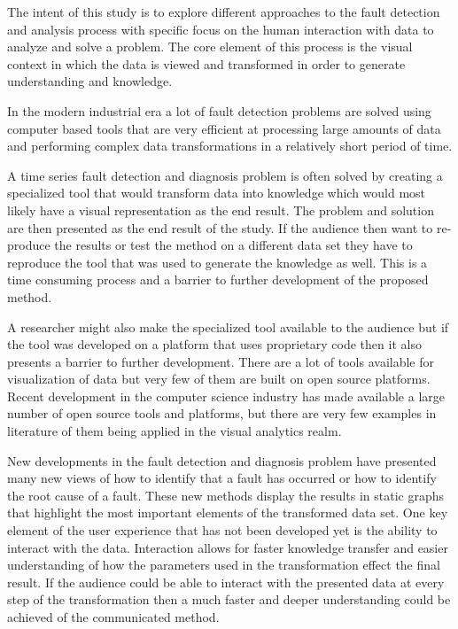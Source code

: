 The intent of this study is to explore different approaches to the fault detection and analysis process with specific focus on the human interaction with data to analyze and solve a problem. The core element of this process is the visual context in which the data is viewed and transformed in order to generate understanding and knowledge.\par
In the modern industrial era a lot of fault detection problems are solved using computer based tools that are very efficient at processing large amounts of data and performing complex data transformations in a relatively short period of time.\par
A time series fault detection and diagnosis problem is often solved by creating a specialized tool that would transform data into knowledge which would most likely have a visual representation as the end result. The problem and solution are then presented as the end result of the study. If the audience then want to re-produce the results or test the method on a different data set they have to reproduce the tool that was used to generate the knowledge as well. This is a time consuming process and a barrier to further development of the proposed method.\par
A researcher might also make the specialized tool available to the audience but if the tool was developed on a platform that uses proprietary code then it also presents a barrier to further development. There are a lot of tools available for visualization of data but very few of them are built on open source platforms. Recent development in the computer science industry has made available a large number of open source tools and platforms, but there are very few examples in literature of them being applied in the visual analytics realm.\par
New developments in the fault detection and diagnosis problem have presented many new views of how to identify that a fault has occurred or how to identify the root cause of a fault. These new methods display the results in static graphs that highlight the most important elements of the transformed data set. One key element of the user experience that has not been developed yet is the ability to interact with the data. Interaction allows for faster knowledge transfer and easier understanding of how the parameters used in the transformation effect the final result. If the audience could be able to interact with the presented data at every step of the transformation then a much faster and deeper understanding could be achieved of the communicated method.

